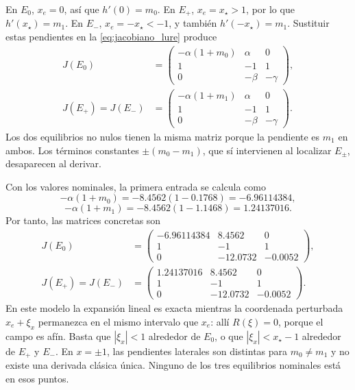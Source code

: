 En \(E_0\), \(x_e=0\), así que \(h'(0)=m_0\). En \(E_+\),
\(x_e=x_\star>1\), por lo que \(h'(x_\star)=m_1\). En \(E_-\),
\(x_e=-x_\star<-1\), y también \(h'(-x_\star)=m_1\). Sustituir estas
pendientes en la \cref{eq:jacobiano_lure} produce
\begin{equation}
\begin{aligned}
J(E_0)&=
\begin{pmatrix}
-\alpha(1+m_0)&\alpha&0\\
1&-1&1\\
0&-\beta&-\gamma
\end{pmatrix},\\[2mm]
J(E_+)=J(E_-)&=
\begin{pmatrix}
-\alpha(1+m_1)&\alpha&0\\
1&-1&1\\
0&-\beta&-\gamma
\end{pmatrix}.
\end{aligned}
\label{eq:jacobianos_ns}
\end{equation}
Los dos equilibrios no nulos tienen la misma matriz porque la pendiente
es \(m_1\) en ambos. Los términos constantes \(\pm(m_0-m_1)\), que sí
intervienen al localizar \(E_\pm\), desaparecen al derivar.

Con los valores nominales, la primera entrada se calcula como
\[
-\alpha(1+m_0)=-8.4562(1-0.1768)=-6.96114384,
\]
\[
-\alpha(1+m_1)=-8.4562(1-1.1468)=1.24137016.
\]
Por tanto, las matrices concretas son
\[
\begin{aligned}
J(E_0)&=
\begin{pmatrix}
-6.96114384&8.4562&0\\
1&-1&1\\
0&-12.0732&-0.0052
\end{pmatrix},\\[2mm]
J(E_+)=J(E_-)&=
\begin{pmatrix}
1.24137016&8.4562&0\\
1&-1&1\\
0&-12.0732&-0.0052
\end{pmatrix}.
\end{aligned}
\]
En este modelo la expansión lineal es exacta mientras la coordenada
perturbada \(x_e+\xi_x\) permanezca en el mismo intervalo que \(x_e\):
allí \(R(\xi)=0\), porque el campo es afín. Basta que \(|\xi_x|<1\) alrededor
de \(E_0\), o que \(|\xi_x|<x_\star-1\) alrededor de \(E_+\) y \(E_-\).
En \(x=\pm1\), las pendientes
laterales son distintas para \(m_0\neq m_1\) y no existe una derivada clásica
única. Ninguno de los tres equilibrios nominales está en esos puntos.

